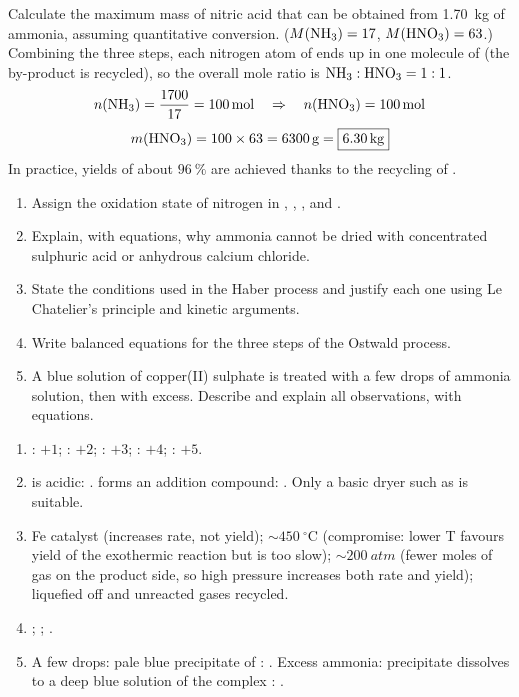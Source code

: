 \documentclass[11pt]{article}
\begin{document}
\begin{exoresolu}
Calculate the maximum mass of nitric acid that can be obtained from \SI{1.70}{kg} of ammonia, assuming quantitative conversion. ($M(\ce{NH3}) = 17$, $M(\ce{HNO3}) = 63$.)
\tcblower
Combining the three steps, each nitrogen atom of  ends up in one molecule of  (the  by-product is recycled), so the overall mole ratio is $\ce{NH3} : \ce{HNO3} = 1 : 1$.
\[ n(\ce{NH3}) = \frac{1700}{17} = \SI{100}{mol} \quad\Rightarrow\quad n(\ce{HNO3}) = \SI{100}{mol} \]
\[ m(\ce{HNO3}) = 100 \times 63 = \SI{6300}{g} = \boxed{\SI{6.30}{kg}} \]
In practice, yields of about $96\ \%$ are achieved thanks to the recycling of .
\end{exoresolu}

\begin{exercice}
\begin{enumerate}
\item Assign the oxidation state of nitrogen in , , ,  and .
\item Explain, with equations, why ammonia cannot be dried with concentrated sulphuric acid or anhydrous calcium chloride.
\item State the conditions used in the Haber process and justify each one using Le Chatelier's principle and kinetic arguments.
\item Write balanced equations for the three steps of the Ostwald process.
\item A blue solution of copper(II) sulphate is treated with a few drops of ammonia solution, then with excess. Describe and explain all observations, with equations.
\end{enumerate}
\end{exercice}

\begin{corrige}[Exercise n° 1]
\begin{enumerate}
\item {}: $+1$; : $+2$; : $+3$; : $+4$; : $+5$.
\item {} is acidic: .  forms an addition compound: . Only a basic dryer such as  is suitable.
\item Fe catalyst (increases rate, not yield); $\sim \SI{450}{\ensuremath{{}^{\circ}\mathrm{C}}}$ (compromise: lower T favours yield of the exothermic reaction but is too slow); $\sim \SI{200}{atm}$ (fewer moles of gas on the product side, so high pressure increases both rate and yield);  liquefied off and unreacted gases recycled.
\item {}; ; .
\item A few drops: pale blue precipitate of : . Excess ammonia: precipitate dissolves to a deep blue solution of the complex : .
\end{enumerate}
\end{corrige}
\end{document}
